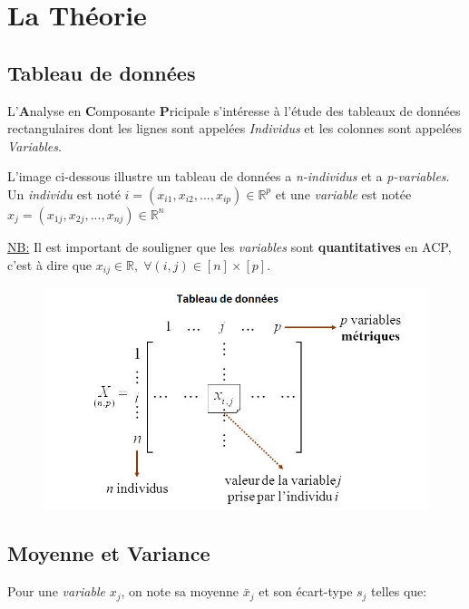 \documentclass{article}
\begin{document}
\section{La Théorie}

\subsection{Tableau de données}

L'\textbf{A}nalyse en \textbf{C}omposante \textbf{P}ricipale s'intéresse à l'étude des tableaux de données rectangulaires dont les lignes sont appelées \textit{Individus} et les colonnes sont appelées \textit{Variables}.
\newline

L'image ci-dessous illustre un tableau de données a \textit{n-individus} et a \textit{p-variables}. Un \textit{individu} est noté $i=(x_{i1},x_{i2}, ... ,x_{ip}) \in \mathbb{R}^p$ et une \textit{variable} est notée $x_j=(x_{1j},x_{2j}, ... ,x_{nj}) \in \mathbb{R}^n$
\newline

\underline{NB:} Il est important de souligner que les \textit{variables} sont \textbf{quantitatives} en ACP, c'est à dire que $x_{ij} \in \mathbb{R}, \; \forall (i,j) \in [n]\times[p].$

\begin{figure}[h!]
\includegraphics[width=\linewidth]{images/tableau.png}
\end{figure}

\subsection{Moyenne et Variance}

Pour une \textit{variable} ${x_j}$, on note sa moyenne $\bar{x}_j$ et son écart-type $s_j$ telles que:
\end{document}
